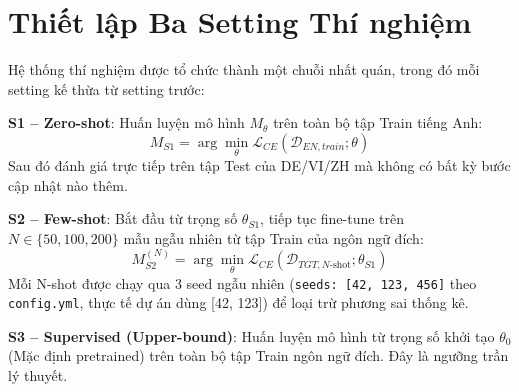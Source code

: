\documentclass[12pt,a4paper,oneside]{report}
\begin{document}
\section{Thiết lập Ba Setting Thí nghiệm}

Hệ thống thí nghiệm được tổ chức thành một chuỗi nhất quán, trong đó mỗi setting kế thừa từ setting trước:

\textbf{S1 -- Zero-shot}: Huấn luyện mô hình $M_\theta$ trên toàn bộ tập Train tiếng Anh:
$$M_{S1} = \arg\min_\theta \mathcal{L}_{CE}(\mathcal{D}_{EN,train}; \theta)$$
Sau đó đánh giá trực tiếp trên tập Test của DE/VI/ZH mà không có bất kỳ bước cập nhật nào thêm.

\textbf{S2 -- Few-shot}: Bắt đầu từ trọng số $\theta_{S1}$, tiếp tục fine-tune trên $N \in \{50, 100, 200\}$ mẫu ngẫu nhiên từ tập Train của ngôn ngữ đích:
$$M_{S2}^{(N)} = \arg\min_\theta \mathcal{L}_{CE}(\mathcal{D}_{TGT,N\text{-shot}}; \theta_{S1})$$
Mỗi N-shot được chạy qua 3 seed ngẫu nhiên (\texttt{seeds: [42, 123, 456]} theo \texttt{config.yml}, thực tế dự án dùng [42, 123]) để loại trừ phương sai thống kê.

\textbf{S3 -- Supervised (Upper-bound)}: Huấn luyện mô hình từ trọng số khởi tạo $\theta_0$ (Mặc định pretrained) trên toàn bộ tập Train ngôn ngữ đích. Đây là ngưỡng trần lý thuyết.
\end{document}
